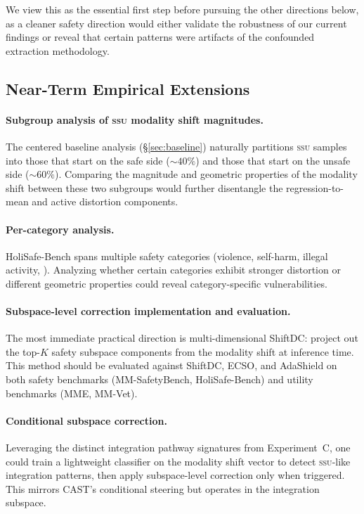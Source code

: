 \documentclass{article}
\newcommand{\ssu}{\textsc{ssu}}
\begin{document}
We view this as the essential first step before pursuing the other directions
below, as a cleaner safety direction would either validate the robustness of our
current findings or reveal that certain patterns were artifacts of the confounded
extraction methodology.

\subsection{Near-Term Empirical Extensions}

\paragraph{Subgroup analysis of \ssu{} modality shift magnitudes.}
The centered baseline analysis (\S\ref{sec:baseline}) naturally partitions \ssu{}
samples into those that start on the safe side (${\sim}40\%$) and those that start
on the unsafe side (${\sim}60\%$).  Comparing the magnitude and geometric
properties of the modality shift between these two subgroups would further
disentangle the regression-to-mean and active distortion components.

\paragraph{Per-category analysis.}
HoliSafe-Bench spans multiple safety categories (violence, self-harm, illegal
activity, \etc).  Analyzing whether certain categories exhibit stronger distortion
or different geometric properties could reveal category-specific vulnerabilities.

\paragraph{Subspace-level correction implementation and evaluation.}
The most immediate practical direction is multi-dimensional ShiftDC: project out
the top-$K$ safety subspace components from the modality shift at inference time.
This method should be evaluated against ShiftDC, ECSO, and AdaShield on both
safety benchmarks (MM-SafetyBench, HoliSafe-Bench) and utility benchmarks (MME,
MM-Vet).

\paragraph{Conditional subspace correction.}
Leveraging the distinct integration pathway signatures from Experiment~C, one
could train a lightweight classifier on the modality shift vector to detect
\ssu-like integration patterns, then apply subspace-level correction only when
triggered.  This mirrors CAST's conditional steering but operates in the
integration subspace.
\end{document}
